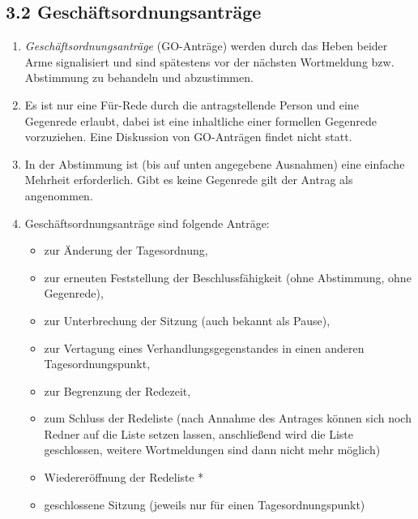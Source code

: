 \documentclass[12pt,oneside]{scrartcl}
\begin{document}
\subsection{3.2 Geschäftsordnungsanträge%
  \label{geschaftsordnungsantrage}%
}

\begin{enumerate}
\item \emph{Geschäftsordnungsanträge} (GO-Anträge) werden durch das Heben
beider Arme signalisiert und sind spätestens vor der nächsten Wortmeldung
bzw. Abstimmung zu behandeln und abzustimmen.

\item Es ist nur eine Für-Rede durch die antragstellende Person und eine Gegenrede
erlaubt, dabei ist eine inhaltliche einer formellen Gegenrede vorzuziehen.
Eine Diskussion von GO-Anträgen findet nicht statt.

\item In der Abstimmung ist (bis auf unten angegebene Ausnahmen) eine einfache
Mehrheit erforderlich.
Gibt es keine Gegenrede gilt der Antrag als angenommen.

\item Geschäftsordnungsanträge sind folgende Anträge:

\begin{itemize}
\item zur Änderung der Tagesordnung,

\item zur erneuten Feststellung der Beschlussfähigkeit
(ohne Abstimmung, ohne Gegenrede),

\item zur Unterbrechung der Sitzung (auch bekannt als \textquotedbl{}Pause\textquotedbl{}),

\item zur Vertagung eines Verhandlungsgegenstandes in einen anderen
Tagesordnungspunkt,

\item zur Begrenzung der Redezeit,

\item zum Schluss der Redeliste (nach Annahme des Antrages können sich
noch Redner auf die Liste setzen lassen, anschließend wird die Liste
geschlossen, weitere Wortmeldungen sind dann nicht mehr möglich)

\item Wiedereröffnung der Redeliste *

\item geschlossene Sitzung (jeweils nur für einen Tagesordnungspunkt)


\end{itemize}
\end{enumerate}
\end{document}
